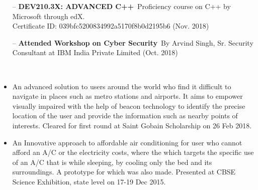 
\begin{itemize}
    \item[--] \textbf{DEV210.3X: ADVANCED C++} \,Proficiency course on C++ by Microsoft through edX.\\Certificate ID: 039bfc5200834992a5170f8b0d2195b6 (Nov. 2018)
    \item[--] \textbf{Attended Workshop on Cyber Security} \,By Arvind Singh, Sr. Security Consultant at IBM India Private Limited (Oct. 2018)
\end{itemize}


\\[3pt]


\begin{itemize}
\item An advanced solution to users around the world who find it difficult to navigate in places such as metro stations and airports. It aims to empower visually impaired with the help of beacon technology to identify the precise location of the user and provide the information such as nearby points of interests. Cleared for first round at Saint Gobain Scholarship on 26 Feb 2018.
\end{itemize}
\smallskip
{}
\begin{itemize}
\item An Innovative approach to affordable air conditioning for user who cannot afford an A/C or the electricity costs, where the which targets the specific use of an A/C that is while sleeping, by cooling only the bed and its surroundings. A prototype for which was also made. Presented at CBSE Science Exhibition, state level on 17-19 Dec 2015.
\end{itemize}


\\[3pt]
\\[3pt]
